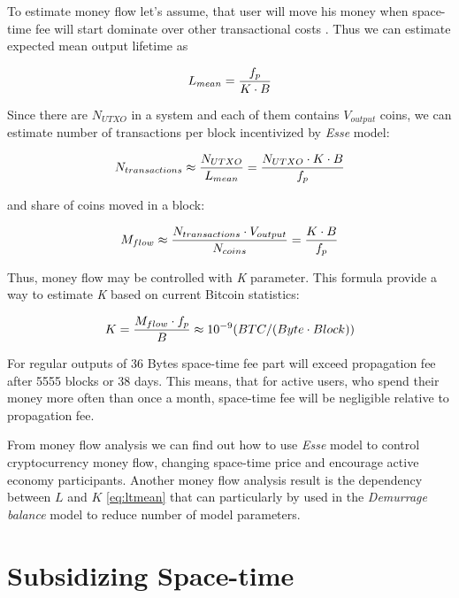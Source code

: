 \documentclass[]{article}   %
\newcommand{\authnote}[2]{\marginpar{\parbox{\marginparwidth}{\tiny %
  \textsf{#1 {\textcolor{blue}{notes: #2}}}}}%
  \textcolor{blue}{\textbf{\dag}}}
\newcommand{\authnote}[2]{
  \textsf{#1 \textcolor{blue}{: #2}}}
\newcommand{\authnote}[2]{}
\newcommand{\dnote}[1]{{\authnote{\textcolor{blue}{Dima notes}}{#1}}}
\newcommand{\esse}{\textit{Esse}}
\begin{document}
To estimate money flow let's assume, that user will move his money when space-time fee will start dominate over other transactional costs \dnote{why?}. Thus we can estimate expected mean output lifetime as

\begin{equation}
\label{eq:ltmean}
L_{mean}={f_p \over K \cdot B}
\end{equation}

Since there are $N_{UTXO}$ in a system and each of them contains $V_{output}$ coins, we can estimate number of transactions per block incentivized by \esse{} model:

\begin{equation}
N_{transactions} \approx {N_{UTXO} \over L_{mean}} = {N_{UTXO} \cdot K \cdot B \over f_p}
\end{equation}

and share of coins moved in a block:

\begin{equation}
M_{flow} \approx { N_{transactions} \cdot V_{output} \over N_{coins}} = {K \cdot B \over f_p}
\end{equation}

Thus, money flow may be controlled with \textit{K} parameter. This formula provide a way to estimate \textit{K} based on current Bitcoin statistics:

\begin{equation}
K={M_{flow} \cdot f_p \over B} \approx {10^{-9}} ({BTC / (Byte \cdot Block)})
\end{equation}

For regular outputs of 36 Bytes space-time fee part will exceed propagation fee after 5555 blocks or 38 days. This means, that for active users, who spend their money more often than once a month, space-time fee will be negligible relative to propagation fee.

From money flow analysis we can find out how to use \esse{} model to control cryptocurrency money flow, changing space-time price and encourage active economy participants. Another money flow analysis result is the dependency between $L$ and $K$ \ref{eq:ltmean} that can particularly by used in the \textit{Demurrage balance} model to reduce number of model parameters.

\section{Subsidizing Space-time}
\end{document}
